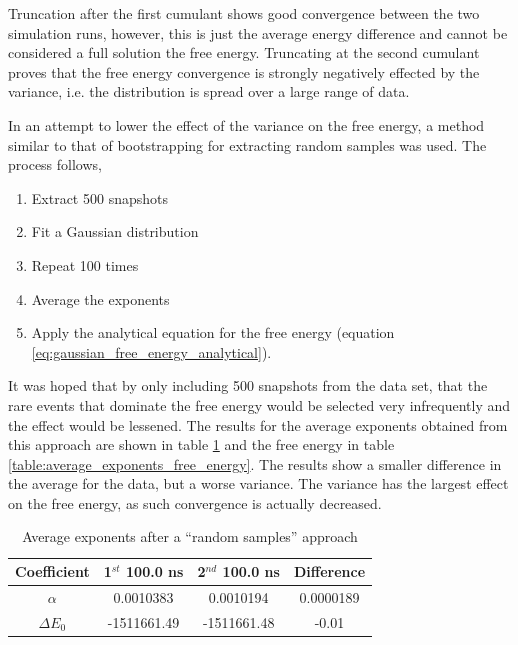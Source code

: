 Truncation after the first cumulant shows good convergence between the two simulation runs, however, this is just the average energy difference and cannot be considered a full solution the free energy.  Truncating at the second cumulant proves that the free energy convergence is strongly negatively effected by the variance, i.e. the distribution is spread over a large range of data.  

In an attempt to lower the effect of the variance on the free energy, a method similar to that of bootstrapping for extracting random samples was used.  The process follows, 

\begin{enumerate}
 \item Extract 500 snapshots
 \item Fit a Gaussian distribution
 \item Repeat 100 times
 \item Average the exponents
 \item Apply the analytical equation for the free energy (equation \ref{eq:gaussian_free_energy_analytical}).
\end{enumerate}

It was hoped that by only including 500 snapshots from the data set, that the rare events that dominate the free energy would be selected very infrequently and the effect would be lessened.  The results for the average exponents obtained from this approach are shown in table \ref{table:average_exponents} and the free energy in table \ref{table:average_exponents_free_energy}.  The results show a smaller difference in the average for the data, but a worse variance.  The variance has the largest effect on the free energy, as such convergence is actually decreased.

\begin{table}[ht]
 \caption{Average exponents after a ``random samples'' approach}
  \begin{center}
  \begin{tabular}{c|c|c|c}
   \hline\hline
Coefficient & 1$^{st}$ 100.0 ns & 2$^{nd}$ 100.0 ns & Difference \\
 \hline
$\alpha$ & 0.0010383 & 0.0010194 & 0.0000189 \\
 \hline
$\Delta E_0$ & -1511661.49 & -1511661.48 & -0.01 \\
  \end{tabular}\label{table:average_exponents}
 \end{center}
\end{table}


